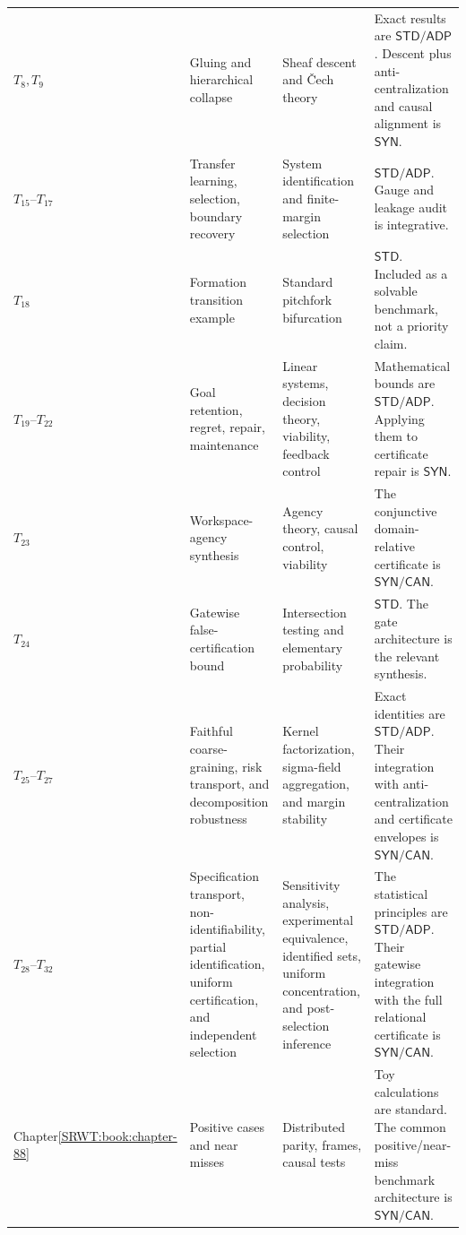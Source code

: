 \begin{longtable}{@{}>{\raggedright\arraybackslash}p{}>{\raggedright\arraybackslash}p{}>{\raggedright\arraybackslash}p{}>{\raggedright\arraybackslash}p{}@{}}
\(T_8,T_9\) & Gluing and hierarchical collapse & Sheaf descent and \v{C}ech theory & Exact results are \(\mathsf{STD}/\mathsf{ADP}\). Descent plus anti-centralization and causal alignment is \(\mathsf{SYN}\). \\
\(T_{15}\)--\(T_{17}\) & Transfer learning, selection, boundary recovery & System identification and finite-margin selection & \(\mathsf{STD}/\mathsf{ADP}\). Gauge and leakage audit is integrative. \\
\(T_{18}\) & Formation transition example & Standard pitchfork bifurcation & \(\mathsf{STD}\). Included as a solvable benchmark, not a priority claim. \\
\(T_{19}\)--\(T_{22}\) & Goal retention, regret, repair, maintenance & Linear systems, decision theory, viability, feedback control & Mathematical bounds are \(\mathsf{STD}/\mathsf{ADP}\). Applying them to certificate repair is \(\mathsf{SYN}\). \\
\(T_{23}\) & Workspace-agency synthesis & Agency theory, causal control, viability & The conjunctive domain-relative certificate is \(\mathsf{SYN}/\mathsf{CAN}\). \\
\(T_{24}\) & Gatewise false-certification bound & Intersection testing and elementary probability & \(\mathsf{STD}\). The gate architecture is the relevant synthesis. \\
\(T_{25}\)--\(T_{27}\) & Faithful coarse-graining, risk transport, and decomposition robustness & Kernel factorization, sigma-field aggregation, and margin stability & Exact identities are \(\mathsf{STD}/\mathsf{ADP}\). Their integration with anti-centralization and certificate envelopes is \(\mathsf{SYN}/\mathsf{CAN}\). \\
\(T_{28}\)--\(T_{32}\) & Specification transport, non-identifiability, partial identification, uniform certification, and independent selection & Sensitivity analysis, experimental equivalence, identified sets, uniform concentration, and post-selection inference & The statistical principles are \(\mathsf{STD}/\mathsf{ADP}\). Their gatewise integration with the full relational certificate is \(\mathsf{SYN}/\mathsf{CAN}\). \\
Chapter\newline\ref{SRWT:book:chapter-88} & Positive cases and near misses & Distributed parity, frames, causal tests & Toy calculations are standard. The common positive/near-miss benchmark architecture is \(\mathsf{SYN}/\mathsf{CAN}\). \\
\bottomrule
\end{longtable}
\normalsize

